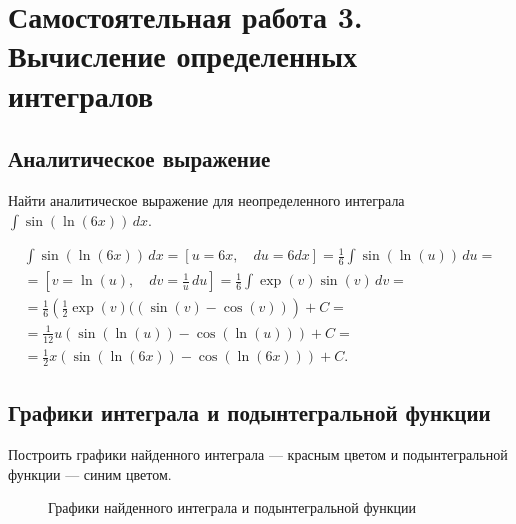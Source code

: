 \documentclass[10pt, a4paper, titlepage]{article}
\begin{document}
\newpage
\section{Самостоятельная работа \textnumero{} 3. Вычисление определенных интегралов}

\subsection*{Аналитическое выражение}

Найти аналитическое выражение для неопределенного интеграла $\int \sin(\ln(6x))\,dx$.

\begin{multline*}
    \int\sin(\ln(6x))\,dx =
    \left[u=6x, \quad du=6dx\right] =
    \frac{1}{6}\int\sin(\ln(u))\,du = \\ =
    \left[v=\ln(u), \quad dv=\frac{1}{u}\,du\right] =
    \frac{1}{6}\int\exp(v)\sin(v)\,dv = \\ =
    \frac{1}{6}\left(\frac{1}{2}\exp(v)((\sin(v)-\cos(v))\right)+C = \\ =
    \frac{1}{12}u(\sin(\ln(u))-\cos(\ln(u)))+C = \\ =
    \frac{1}{2}x(\sin(\ln(6x))-\cos(\ln(6x)))+C.
\end{multline*}

\subsection*{Графики интеграла и подынтегральной функции}

Построить графики найденного интеграла --- красным цветом и подынтегральной функции --- синим цветом.

\begin{figure}[H]
    \centering
    \caption{Графики найденного интеграла и подынтегральной функции}
\end{figure}
\end{document}

